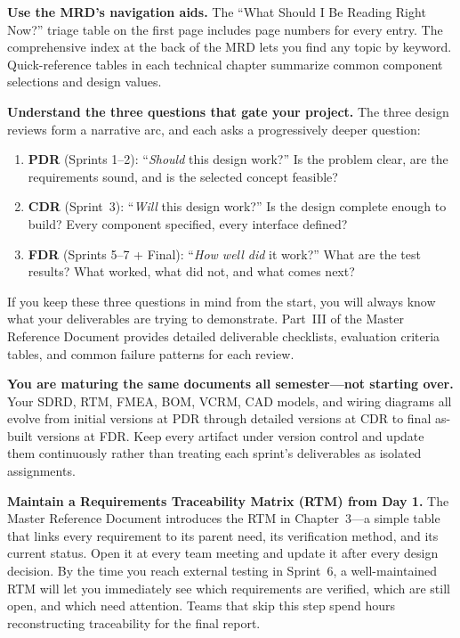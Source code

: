 \documentclass[11pt,letterpaper]{article}
\begin{document}
\begin{protip}
\textbf{Use the MRD's navigation aids.} The ``What Should I Be Reading Right Now?'' triage table on the first page includes page numbers for every entry. The comprehensive index at the back of the MRD lets you find any topic by keyword. Quick-reference tables in each technical chapter summarize common component selections and design values.
\end{protip}

\begin{protip}
\textbf{Understand the three questions that gate your project.} The three design reviews form a narrative arc, and each asks a progressively deeper question:
\begin{enumerate}[leftmargin=*, itemsep=1pt, topsep=0pt]
    \item \textbf{PDR} (Sprints 1--2): ``\textit{Should} this design work?'' Is the problem clear, are the requirements sound, and is the selected concept feasible?
    \item \textbf{CDR} (Sprint~3): ``\textit{Will} this design work?'' Is the design complete enough to build? Every component specified, every interface defined?
    \item \textbf{FDR} (Sprints 5--7 + Final): ``\textit{How well did} it work?'' What are the test results? What worked, what did not, and what comes next?
\end{enumerate}
If you keep these three questions in mind from the start, you will always know what your deliverables are trying to demonstrate. Part~III of the Master Reference Document provides detailed deliverable checklists, evaluation criteria tables, and common failure patterns for each review.
\end{protip}

\begin{tipbox}
\textbf{You are maturing the same documents all semester---not starting over.} Your SDRD, RTM, FMEA, BOM, VCRM, CAD models, and wiring diagrams all evolve from initial versions at PDR through detailed versions at CDR to final as-built versions at FDR. Keep every artifact under version control and update them continuously rather than treating each sprint's deliverables as isolated assignments.
\end{tipbox}

\begin{protip}
\textbf{Maintain a Requirements Traceability Matrix (RTM) from Day 1.} The Master Reference Document introduces the RTM in Chapter~3---a simple table that links every requirement to its parent need, its verification method, and its current status. Open it at every team meeting and update it after every design decision. By the time you reach external testing in Sprint~6, a well-maintained RTM will let you immediately see which requirements are verified, which are still open, and which need attention. Teams that skip this step spend hours reconstructing traceability for the final report.
\end{protip}
\end{document}
